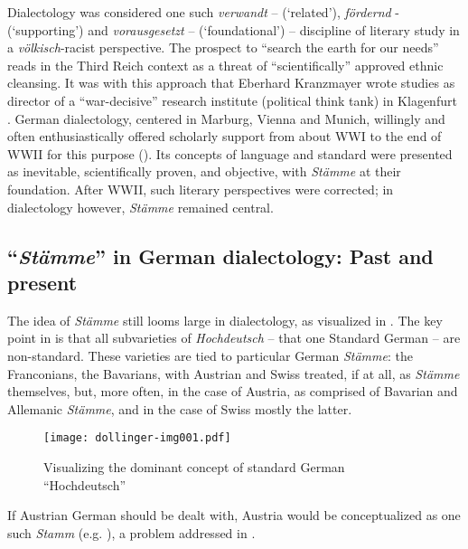 \documentclass[output=paper]{langscibook}
\begin{document}
Dialectology was considered one such \textit{verwandt} – (`related'), \textit{fördernd} - (`supporting') and \textit{vorausgesetzt} – (`foundational') – discipline of literary study in a \textit{völkisch}-racist perspective. The prospect to “search the earth for our needs” reads in the Third Reich context as a threat of “scientifically” approved ethnic cleansing. It was with this approach that Eberhard Kranzmayer wrote studies as director of a “war-decisive” research institute (political think tank) in Klagenfurt \citep{Dollinger2023a}. German dialectology, centered in Marburg, Vienna and Munich, willingly and often enthusiastically offered scholarly support from about WWI to the end of WWII for this purpose (\cites[42]{Hutton1999}[66--67, 11]{Burrell2023}[]{Dollinger2024}). Its concepts of language and standard were presented as inevitable, scientifically proven, and objective, with \textit{Stämme} at their foundation. After WWII, such literary perspectives were corrected; in dialectology however, \textit{Stämme} remained central.

\subsection{“\textit{Stämme}” in German dialectology: Past and present}
\label{sec:dollinger:2.2}
The idea of \textit{Stämme} still looms large in dialectology, as visualized in . The key point in  is that all subvarieties of \textit{Hochdeutsch} – that one Standard German – are non-standard. These varieties are tied to particular German \textit{Stämme}: the Franconians, the Bavarians, with Austrian and Swiss treated, if at all, as \textit{Stämme} themselves, but, more often, in the case of Austria, as comprised of Bavarian and Allemanic \textit{Stämme}, and in the case of Swiss mostly the latter.


\begin{figure}
\texttt{[image: dollinger-img001.pdf]}
\caption{Visualizing the dominant concept of standard German “Hochdeutsch” \citep[40]{Dollinger2019c}}
\label{fig:dollinger:1}
\end{figure}

If Austrian German should be dealt with, Austria would be conceptualized as one such \textit{Stamm} (e.g. \citealt[I: 106]{Kranzmayer1956}), a problem addressed in \citet{Muhr1998}.
\end{document}
